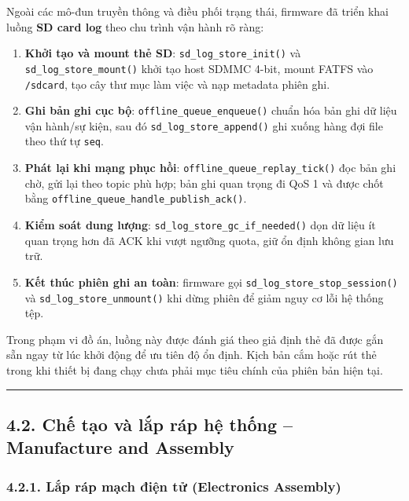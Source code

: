 \documentclass[a4paper]{extarticle}
\providecommand{\tightlist}{%
  \setlength{\itemsep}{0pt}\setlength{\parskip}{0pt}}
\begin{document}
Ngoài các mô-đun truyền thông và điều phối trạng thái, firmware đã triển
khai luồng \textbf{SD card log} theo chu trình vận hành rõ ràng:

\begin{enumerate}
\def\labelenumi{\arabic{enumi}.}
\tightlist
\item
  \textbf{Khởi tạo và mount thẻ SD}: \texttt{sd\_log\_store\_init()} và
  \texttt{sd\_log\_store\_mount()} khởi tạo host SDMMC 4-bit, mount
  FATFS vào \texttt{/sdcard}, tạo cây thư mục làm việc và nạp metadata
  phiên ghi.
\item
  \textbf{Ghi bản ghi cục bộ}: \texttt{offline\_queue\_enqueue()} chuẩn
  hóa bản ghi dữ liệu vận hành/sự kiện, sau đó
  \texttt{sd\_log\_store\_append()} ghi xuống hàng đợi file theo thứ tự
  \texttt{seq}.
\item
  \textbf{Phát lại khi mạng phục hồi}:
  \texttt{offline\_queue\_replay\_tick()} đọc bản ghi chờ, gửi lại theo
  topic phù hợp; bản ghi quan trọng đi QoS 1 và được chốt bằng
  \texttt{offline\_queue\_handle\_publish\_ack()}.
\item
  \textbf{Kiểm soát dung lượng}:
  \texttt{sd\_log\_store\_gc\_if\_needed()} dọn dữ liệu ít quan trọng hơn đã
  ACK khi vượt ngưỡng quota, giữ ổn định không gian lưu trữ.
\item
  \textbf{Kết thúc phiên ghi an toàn}: firmware gọi
  \texttt{sd\_log\_store\_stop\_session()} và
  \texttt{sd\_log\_store\_unmount()} khi dừng phiên để giảm nguy cơ lỗi
  hệ thống tệp.
\end{enumerate}

Trong phạm vi đồ án, luồng này được đánh giá theo giả định thẻ đã được
gắn sẵn ngay từ lúc khởi động để ưu tiên độ ổn định. Kịch bản cắm hoặc
rút thẻ trong khi thiết bị đang chạy chưa phải mục tiêu chính của phiên
bản hiện tại.

\begin{center}\rule{0.5\linewidth}{0.5pt}\end{center}

\subsection{4.2. Chế tạo và lắp ráp hệ thống -- Manufacture and
Assembly}\label{42-chux1ebf-tux1ea1o-vuxe0-lux1eafp-ruxe1p-hux1ec7-thux1ed1ng--manufacture-and-assembly}

\subsubsection{4.2.1. Lắp ráp mạch điện tử (Electronics
Assembly)}\label{421-lux1eafp-ruxe1p-mux1ea1ch-ux111iux1ec7n-tux1eed-electronics-assembly}
\end{document}
